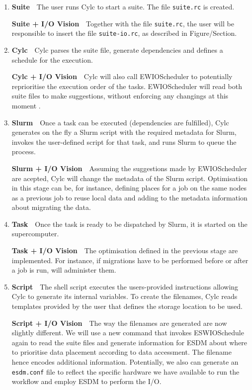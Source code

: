 \documentclass[a4paper]{article}
\begin{document}
\begin{enumerate}

  \item \textbf{Suite}\ \ The user runs Cylc to start a suite. The file \texttt{suite.rc} is created.

  \textbf{Suite + I/O Vision}\ \ Together with the file \texttt{suite.rc}, the user will be responsible to insert the file \texttt{suite-io.rc}, as described in Figure/Section.

  \item \textbf{Cylc}\ \ Cylc parses the suite file, generate dependencies and defines a schedule for the execution.

  \textbf{Cylc + I/O Vision}\ \ Cylc will also call EWIOScheduler to potentially reprioritise the execution order of the tasks.
  EWIOScheduler will read both suite files to make suggestions, without enforcing any changings at this moment {\color{cyan}{why?}}.

  \item \textbf{Slurm}\ \ Once a task can be executed (dependencies are fulfilled), Cylc generates on the fly a Slurm script with the required metadata for Slurm, invokes the user-defined script for that task, and runs Slurm to queue the process.

  \textbf{Slurm + I/O Vision}\ \ Assuming the suggestions made by EWIOScheduler are acepted, Cylc will change the metadata of the Slurm script. Optimisation in this stage can be, for instance, defining places for a job on the same nodes as a previous job to reuse local data {\color{cyan}{NextgenIO?}} and adding to the metadata information about migrating the data.

  \item \textbf{Task}\ \ Once the task is ready to be dispatched by Slurm, it is started on the supercomputer.

  \textbf{Task + I/O Vision}\ \ The optimisation defined in the previous stage are implemented. For instance, if migrations have to be performed before or after a job is run, \sout{{\color{cyan}{it}}} {\color{cyan}{Slurm}} will administer them.

  \item \textbf{Script}\ \ The shell script executes the users-provided instructions allowing Cylc to generate its internal variables. To create the filenames, Cylc reads templates provided by the user that defines the storage location to be used.

  \textbf{Script + I/O Vision}\ \ The way the filenames are generated are now slightly different. We will use a new command that invokes ESWIOSchedule again {\color{cyan}{Slurm is calling ESWIOSchedule?}} to read the suite files and generate information for ESDM about where to prioritise {\color{cyan}{prioritise ==> Is this the right word here?}} data placement according to data accessment. The filename hence encodes additional information.
  Potentially, we also can generate an \texttt{esdm.conf} file to reflect the specific hardware we have available to run the workflow and employ ESDM to perform the I/O.


\end{enumerate}
\end{document}
